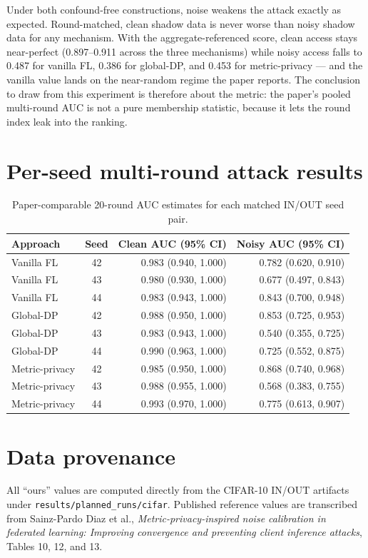 \documentclass[10pt]{article}
\begin{document}
Under both confound-free constructions, noise weakens the attack exactly as expected. Round-matched, clean
shadow data is never worse than noisy shadow data for any mechanism. With the aggregate-referenced score, clean access
stays near-perfect (0.897--0.911 across the three mechanisms) while noisy access falls to
0.487 for vanilla FL, 0.386 for global-DP, and
0.453 for metric-privacy --- and the vanilla value lands on the near-random
regime the paper reports. The conclusion to draw from this experiment is therefore about the metric: the paper's
pooled multi-round AUC is not a pure membership statistic, because it lets the round index leak into the
ranking.

\clearpage
\section*{Per-seed multi-round attack results}
\begin{table}[h]
\centering
\caption{Paper-comparable 20-round AUC estimates for each matched IN/OUT seed pair.}
\begin{tabular}{lcrr}
\toprule
Approach & Seed & Clean AUC (95\% CI) & Noisy AUC (95\% CI) \\
\midrule
Vanilla FL & 42 & 0.983 (0.940, 1.000) & 0.782 (0.620, 0.910) \\
Vanilla FL & 43 & 0.980 (0.930, 1.000) & 0.677 (0.497, 0.843) \\
Vanilla FL & 44 & 0.983 (0.943, 1.000) & 0.843 (0.700, 0.948) \\
\midrule
Global-DP & 42 & 0.988 (0.950, 1.000) & 0.853 (0.725, 0.953) \\
Global-DP & 43 & 0.983 (0.943, 1.000) & 0.540 (0.355, 0.725) \\
Global-DP & 44 & 0.990 (0.963, 1.000) & 0.725 (0.552, 0.875) \\
\midrule
Metric-privacy & 42 & 0.985 (0.950, 1.000) & 0.868 (0.740, 0.968) \\
Metric-privacy & 43 & 0.988 (0.955, 1.000) & 0.568 (0.383, 0.755) \\
Metric-privacy & 44 & 0.993 (0.970, 1.000) & 0.775 (0.613, 0.907) \\
\bottomrule
\end{tabular}
\end{table}

\section*{Data provenance}
All ``ours'' values are computed directly from the CIFAR-10 IN/OUT artifacts under
\texttt{results/planned\_runs/cifar}. Published reference values are transcribed from
Sainz-Pardo Diaz et al., \emph{Metric-privacy-inspired noise calibration in federated learning:
Improving convergence and preventing client inference attacks}, Tables 10, 12, and 13.
\end{document}
